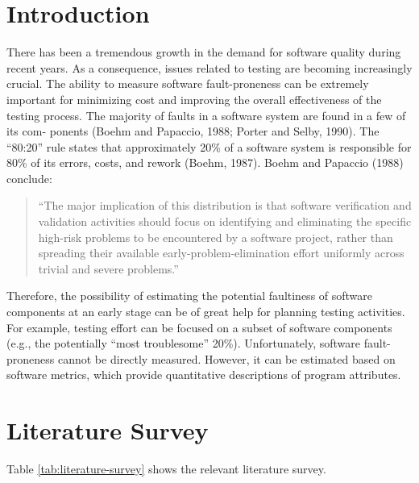 \documentclass[10pt, conference, compsocconf]{IEEEtran}
\begin{document}
\section{Introduction}
There has been a tremendous growth in the demand for software quality during recent years. As a consequence, issues related to testing are becoming increasingly crucial. The ability to measure software fault-proneness can be extremely important for minimizing cost and improving the overall effectiveness of the testing process. The majority of faults in a software system are found in a few of its com- ponents (Boehm and Papaccio, 1988; Porter and Selby, 1990). The ``80:20'' rule states that approximately 20\% of a software system is responsible for 80\% of its errors, costs, and rework (Boehm, 1987). Boehm and Papaccio (1988) conclude:
\begin{quote}
  ``The major implication of this distribution is that software verification and validation activities should focus on identifying and eliminating the specific high-risk problems to be encountered by a software project, rather than spreading their available early-problem-elimination effort uniformly across trivial and severe problems.''
\end{quote}
Therefore, the possibility of estimating the potential faultiness of software components at an early stage can be of great help for planning testing activities. For example, testing effort can be focused on a subset of software components (e.g., the potentially ``most troublesome'' 20\%). Unfortunately, software fault-proneness cannot be directly measured. However, it can be estimated based on software metrics, which provide quantitative descriptions of program attributes.

\section{Literature Survey}

Table \ref{tab:literature-survey} shows the relevant literature survey.
\end{document}
